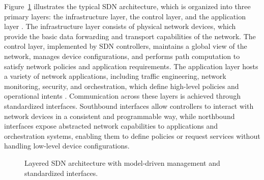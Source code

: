 Figure~\ref{fig:ch2-sdn-architecture} illustrates the typical SDN architecture, which is organized into three primary layers: the infrastructure layer, the control layer, and the application layer \cite{ibm_sdn}.
The infrastructure layer consists of physical network devices, which provide the basic data forwarding and transport capabilities of the network.
The control layer, implemented by SDN controllers, maintains a global view of the network, manages device configurations, and performs path computation to satisfy network policies and application requirements.
The application layer hosts a variety of network applications, including traffic engineering, network monitoring, security, and orchestration, which define high-level policies and operational intents \cite{agarwal2013traffic}.
Communication across these layers is achieved through standardized interfaces.
Southbound interfaces allow controllers to interact with network devices in a consistent and programmable way,
while northbound interfaces expose abstracted network capabilities to applications and orchestration systems, enabling them to define policies or request services without handling low-level device configurations.
\usetikzlibrary{positioning}

\begin{figure}[H]
    \centering

    \caption{Layered SDN architecture with model-driven management and standardized interfaces.}
    \label{fig:ch2-sdn-architecture}
\end{figure}


